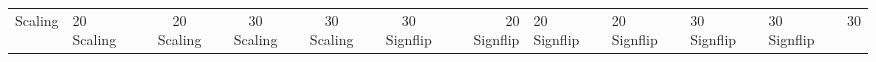 \begin{table}[!t]
\begin{tabular}{llccccr}
Scaling & 20%
Scaling & 20%
Scaling & 30%
Scaling & 30%
Scaling & 30%
\hline
Signflip & 20%
Signflip & 20%
Signflip & 20%
Signflip & 30%
Signflip & 30%
Signflip & 30%
\hline\end{tabular}\end{table}